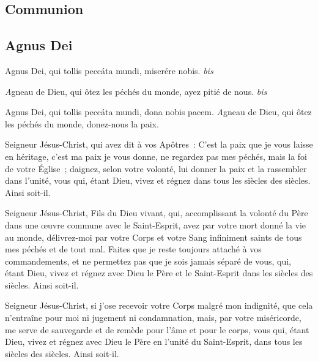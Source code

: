 \subsection*{Communion}
\subsection*{%
Agnus Dei%
}


Agnus Dei, qui tollis peccáta mundi, miserére nobis. \emph{bis}%

{\textit Agneau de Dieu, qui ôtez les péchés du monde, ayez pitié de nous. \emph{bis}%
}%

{%
Agnus Dei, qui tollis peccáta mundi, dona nobis pacem.%
}{%
\textit Agneau de Dieu, qui ôtez les péchés du monde, donez-nous la paix.%
}%

Seigneur Jésus-Christ, qui avez dit à vos Apôtres~: C'est la paix que je vous laisse en héritage, c'est ma paix je vous donne, ne regardez pas mes péchés, mais la foi de votre Église~; daignez, selon votre volonté, lui donner la paix et la rassembler dans l'unité, vous qui, étant Dieu, vivez et régnez dans tous les siècles des siècles. Ainsi soit-il.


Seigneur Jésus-Christ, Fils du Dieu vivant, qui, accomplissant la volonté du Père dans une œuvre commune avec le Saint-Esprit, avez par votre mort donné la vie au monde, délivrez-moi par votre Corps et votre Sang infiniment saints de tous mes péchés et de tout mal. Faites que je reste toujours attaché à vos commandements, et ne permettez pas que je sois jamais séparé de vous, qui, étant Dieu, vivez et régnez avec Dieu le Père et le Saint-Esprit dans les siècles des siècles. Ainsi soit-il.

Seigneur Jésus-Christ, si j'ose recevoir votre Corps malgré mon indignité, que cela n'entraîne pour moi ni jugement ni condamnation, mais, par votre miséricorde, me serve de sauvegarde et de remède pour l'âme et pour le corps, vous qui, étant Dieu, vivez et régnez avec Dieu le Père en l'unité du Saint-Esprit, dans tous les siècles des siècles. Ainsi soit-il.

